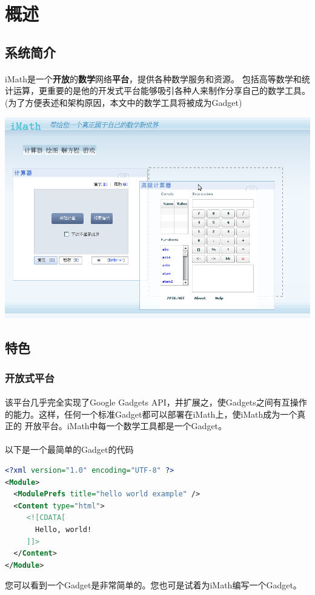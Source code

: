 \documentclass[12pt,a4paper,titlepage]{article}
\begin{document}
\section{概述}
\subsection{系统简介}
\paragraph{}
iMath是一个\textbf{开放}的\textbf{数学}网络\textbf{平台}，提供各种数学服务和资源。
包括高等数学和统计运算，更重要的是他的开发式平台能够吸引各种人来制作分享自己的数学工具。(为了方便表述和架构原因，本文中的数学工具将被成为Gadget)

\includegraphics[width=\textwidth]{first.png}

\subsection{特色}

\subsubsection{开放式平台}
\paragraph{}
该平台几乎完全实现了Google  Gadgets API，并扩展之，使Gadgets之间有互操作的能力。这样，任何一个标准Gadget都可以部署在iMath上，使iMath成为一个真正的
开放平台。iMath中每一个数学工具都是一个Gadget。
\paragraph{}
以下是一个最简单的Gadget的代码
\begin{lstlisting}[language=xml]
<?xml version="1.0" encoding="UTF-8" ?> 
<Module>
  <ModulePrefs title="hello world example" /> 
  <Content type="html">
     <![CDATA[ 
       Hello, world!
     ]]>
  </Content> 
</Module>
\end{lstlisting}
您可以看到一个Gadget是非常简单的。您也可是试着为iMath编写一个Gadget。
\end{document}
